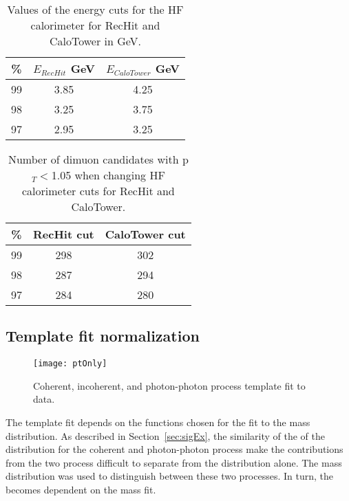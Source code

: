       \begin{table}[!Hhbt]
        \begin{center}
          \caption{Values of the energy cuts for the HF calorimeter for RecHit and CaloTower in GeV.}
          \label{tab:hfAdjustedThresholds}
          \begin{tabular}{|c|c|c|} \hline
            \% &  $E_{RecHit}$ GeV & $E_{CaloTower}$ GeV\\ 
            \hline
            99 & 3.85& 4.25 \\ \hline
            98 & 3.25& 3.75 \\ \hline
            97 & 2.95& 3.25 \\  \hline
           \end{tabular}
         \end{center}
      \end{table}

      \begin{table}[!Hhbt]
        \begin{center}
          \caption{Number of dimuon candidates with  p$_{T} <$1.05 when changing HF calorimeter cuts for RecHit and CaloTower.}
          \label{tab:hfAdjThreshYields}
          \begin{tabular}{|c|c|c|} \hline
            \% &  RecHit cut & CaloTower cut\\ \hline
            99 &   298 & 302 \\ \hline
            98 &  287  & 294 \\ \hline
            97 & 284 & 280 \\ \hline
          \end{tabular}
        \end{center}
      \end{table}

    \subsection{Template fit normalization}
      \begin{figure}[!Hhtb]
        \centering
        \texttt{[image: ptOnly]}
        \caption{Coherent, incoherent, and photon-photon process \pt{} template fit to data.}
        \label{fig:ptTempFit}
      \end{figure}
     
      The \pt{} template fit depends on the functions chosen for the fit
        to the mass distribution.
      As described in Section~\ref{sec:sigEx}, the similarity of the of the 
        \pt{} distribution for the coherent and photon-photon process make
        the contributions from the two process difficult to separate from the 
        \pt{} distribution alone.
      The mass distribution was used to distinguish between these two processes.
      In turn, the \pt{} becomes dependent on the mass fit. 

